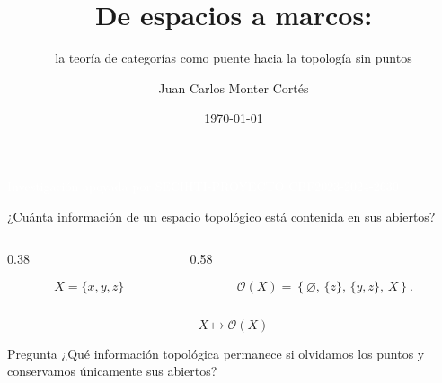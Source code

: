 \documentclass[compress,12pt]{beamer}
\title{De espacios a marcos:}
\subtitle{la teoría de categorías como puente hacia la topología sin puntos}
\date{\today}
\author{Juan Carlos Monter Cortés}
\institute{Universidad de Guadalajara}
\begin{document}

\begin{frame}[plain]
\titlepage

\vfill
\begin{center}
    \textcolor{white}{\scriptsize Investigación apoyada por SECIHTI-PROYECTO CBF2023-2024-2630}
\end{center}
\end{frame}


\begin{frame}{¿Cuánta información de un espacio topológico está contenida en sus abiertos?}
\small{
\begin{columns}[c]

\begin{column}{0.38\textwidth}
\centering

\[
X=\{x,y,z\}
\]

\vspace{0.3cm}

\end{column}

\begin{column}{0.58\textwidth}

\[
\mathcal O(X)
=
\left\{
\varnothing,\,
\{z\},\,
\{y,z\},\,
X
\right\}.
\]

\centering


\end{column}

\end{columns}
}

\[
X \longmapsto \mathcal O(X)
\]

\begin{block}{Pregunta}
¿Qué información topológica permanece si olvidamos los puntos y
 conservamos únicamente sus abiertos?
\end{block}

\end{frame}
\end{document}
